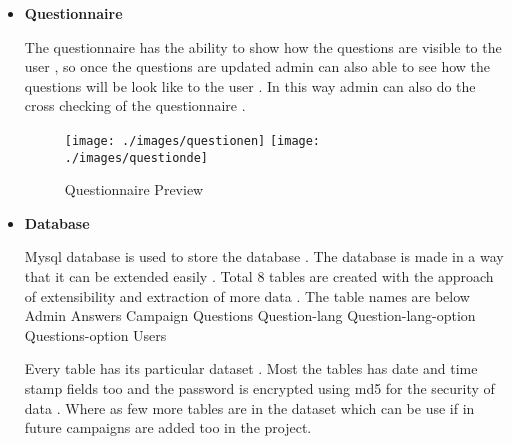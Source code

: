 \begin{itemize}
	\item \textbf{Questionnaire}
	\par The questionnaire has the ability to show how the questions are visible to the user , so once the questions are updated admin can also able to see how the questions will be look like to the user . In this way admin can also do the cross checking of the questionnaire . 
	\begin{figure}[H]
	\centering
	\texttt{[image: ./images/questionen]}
	\texttt{[image: ./images/questionde]}
	\caption{Questionnaire Preview}
	\label{figure1:cms_questionnaire_preview}
	\end{figure}
	\item \textbf{Database}
	\par Mysql database is used to store the database . The database is made in a way that it can be extended easily . Total 8 tables are created with the approach of extensibility and extraction of more data . The table names are below 
		\subitem{-} Admin
		\subitem{-} Answers
		\subitem{-} Campaign
		\subitem{-} Questions
		\subitem{-} Question-lang
		\subitem{-} Question-lang-option
		\subitem{-} Questions-option
		\subitem{-} Users
	\par Every table has its particular dataset . Most the tables has date and time stamp fields too and the password is encrypted using md5 for the security of data . Where as few more tables are in the dataset which can be use if in future campaigns are added too in the project.
\end{itemize}
